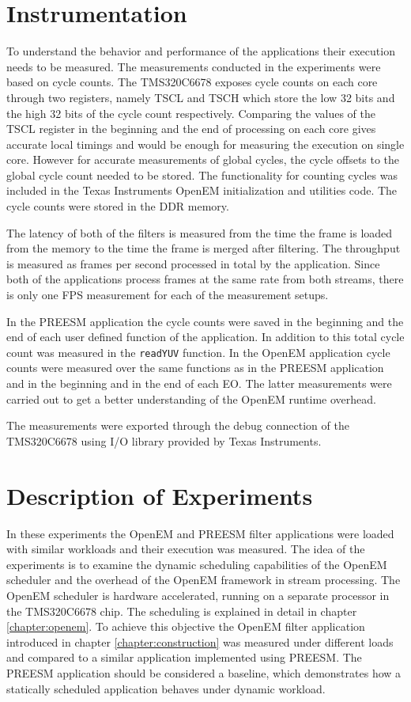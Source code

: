 \section{Instrumentation}
\label{sec:instrumentation}
To understand the behavior and performance of the applications their execution needs to be measured. The measurements conducted in the experiments were based on cycle counts. The TMS320C6678 exposes cycle counts on each core through two registers, namely TSCL and TSCH which store the low 32 bits and the high 32 bits of the cycle count respectively. Comparing the values of the TSCL register in the beginning and the end of processing on each core gives accurate local timings and would be enough for measuring the execution on single core. However for accurate measurements of global cycles, the cycle offsets to the global cycle count needed to be stored. The functionality for counting cycles was included in the Texas Instruments OpenEM initialization and utilities code. The cycle counts were stored in the DDR memory.

The latency of both of the filters is measured from the time the frame is loaded from the memory to the time the frame is merged after filtering. The throughput is measured as frames per second processed in total by the application. Since both of the applications process frames at the same rate from both streams, there is only one FPS measurement for each of the measurement setups.

In the PREESM application the cycle counts were saved in the beginning and the end of each user defined function of the application. In addition to this total cycle count was measured in the \texttt{readYUV} function. In the OpenEM application cycle counts were measured over the same functions as in the PREESM application and in the beginning and in the end of each EO. The latter measurements were carried out to get a better understanding of the OpenEM runtime overhead.

The measurements were exported through the debug connection of the TMS320C6678 using I/O library provided by Texas Instruments.

\section{Description of Experiments}
\label{sec:experiment-description}
In these experiments the OpenEM and PREESM filter applications were loaded with similar workloads and their execution was measured. The idea of the experiments is to examine the dynamic scheduling capabilities of the OpenEM scheduler and the overhead of the OpenEM framework in stream processing. The OpenEM scheduler is hardware accelerated, running on a separate processor in the TMS320C6678 chip. The scheduling is explained in detail in chapter \ref{chapter:openem}. To achieve this objective the OpenEM filter application introduced in chapter \ref{chapter:construction} was measured under different loads and compared to a similar application implemented using PREESM. The PREESM application should be considered a baseline, which demonstrates how a statically scheduled application behaves under dynamic workload.

